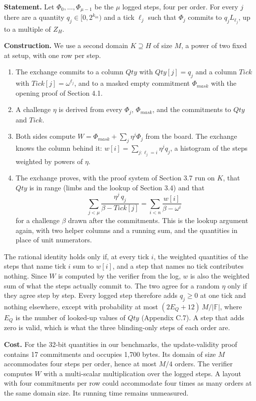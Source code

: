 \textbf{Statement.} Let \(\Phi_0, \ldots, \Phi_{\mu-1}\) be the \(\mu\) logged steps, four per order. For every \(j\) there are a quantity \(q_j \in [0, 2^{k_{in}})\) and a tick \(\ell_j\) such that \(\Phi_j\) commits to \(q_j L_{\ell_j}\), up to a multiple of \(Z_H\).

\textbf{Construction.} We use a second domain \(K \supseteq H\) of size \(M\), a power of two fixed at setup, with one row per step.

\begin{enumerate}
\def\labelenumi{\arabic{enumi}.}
\item
  The exchange commits to a column \(Qty\) with \(Qty[j] = q_j\) and a column \(Tick\) with \(Tick[j] = \omega^{\ell_j}\), and to a masked empty commitment \(\Phi_{mask}\) with the opening proof of Section 4.1.
\item
  A challenge \(\eta\) is derived from every \(\Phi_j\), \(\Phi_{mask}\), and the commitments to \(Qty\) and \(Tick\).
\item
  Both sides compute \(W = \Phi_{mask} + \sum_j \eta^j \Phi_j\) from the board. The exchange knows the column behind it: \(w[i] = \sum_{j : \ell_j = i} \eta^j q_j\), a histogram of the steps weighted by powers of \(\eta\).
\item
  The exchange proves, with the proof system of Section 3.7 run on \(K\), that \(Qty\) is in range (limbs and the lookup of Section 3.4) and that
  \[\sum_{j<\mu} \frac{\eta^j\, q_j}{\beta - Tick[j]} = \sum_{i<n} \frac{w[i]}{\beta - \omega^i}\]
  for a challenge \(\beta\) drawn after the commitments. This is the lookup argument again, with two helper columns and a running sum, and the quantities in place of unit numerators.
\end{enumerate}

The rational identity holds only if, at every tick \(i\), the weighted quantities of the steps that name tick \(i\) sum to \(w[i]\), and a step that names no tick contributes nothing. Since \(W\) is computed by the verifier from the log, \(w\) is also the weighted sum of what the steps actually commit to. The two agree for a random \(\eta\) only if they agree step by step. Every logged step therefore adds \(q_j \ge 0\) at one tick and nothing elsewhere, except with probability at most \((2E_Q + 12)\,M/|\mathbb{F}|\), where \(E_Q\) is the number of looked-up values of \(Qty\) (Appendix C.7). A step that adds zero is valid, which is what the three blinding-only steps of each order are.

\textbf{Cost.} For the 32-bit quantities in our benchmarks, the update-validity proof contains 17 commitments and occupies 1,700 bytes. Its domain of size \(M\) accommodates four steps per order, hence at most \(M/4\) orders. The verifier computes \(W\) with a multi-scalar multiplication over the logged steps. A layout with four commitments per row could accommodate four times as many orders at the same domain size. Its running time remains unmeasured.

